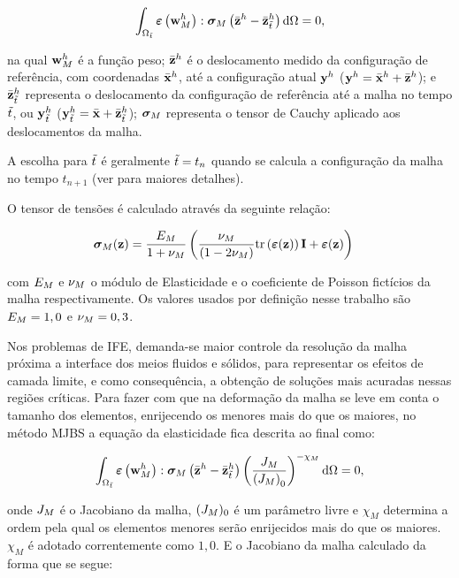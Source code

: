 \documentclass[tese_patricia]{subfiles}
\begin{document}
\begin{align}
	\int_{\Omega_{\tilde{t}}} \bm{\varepsilon} \left(\mathbf{w}_{M}^h\right) : \boldsymbol{\sigma}_{M} \left(\bar{\mathbf{z}}^h - \bar{\mathbf{z}}_{\tilde{t}}^h \right) \mathrm{d} \Omega = 0,
	\label{eq:elasticity}
\end{align}


\noindent na qual $\mathbf{w}_{M}^h$ é a função peso; $\bar{\mathbf{z}}^h$ é o deslocamento medido da configuração de referência, com coordenadas $\bar{\mathbf{x}}^h$, até a configuração atual $\mathbf{y}^h$ ($\mathbf{y}^h = \bar{\mathbf{x}}^h +\bar{\mathbf{z}}^h $); e 
$\bar{\mathbf{z}}_{\tilde{t}}^h$ representa o deslocamento da configuração de referência até a malha no tempo ${\tilde{t}}$, ou $\mathbf{y}^h_{\tilde{t}}$ ($\mathbf{y}^h_{\tilde{t}} = \bar{\mathbf{x}} + \bar{\mathbf{z}}_{\tilde{t}}^h$); $\boldsymbol{\sigma}_{M}$ representa o tensor de Cauchy aplicado aos deslocamentos da malha.

A escolha para $\tilde{t}$ é geralmente $\tilde{t} = {t_{n}}$ quando se calcula a configuração da malha no tempo ${t_{n+1}}$ (ver  para maiores detalhes). 

O tensor de tensões é calculado através da seguinte relação:

\begin{align}
	\boldsymbol{\sigma}_{M}(\mathbf{z})
	&=
	\frac{E_{M}}{1+\nu_{M}}
	\left(
	\frac{\nu_{M}}{(1 - 2 \nu_{M})}
	\mathrm{tr}\left(\bm{\varepsilon}(\mathbf{z})\right)\mathbf{I}
	+
	\bm{\varepsilon}(\mathbf{z})
	\right)
\end{align}

\noindent com $E_{M}$ e $\nu_{M}$ o módulo de Elasticidade e o coeficiente de Poisson fictícios da malha respectivamente. Os valores usados por definição nesse trabalho são $E_{M} =1,0$ e $\nu_{M} = 0,3$.

Nos problemas de IFE, demanda-se maior controle da resolução da malha próxima a interface dos meios fluidos e sólidos, para representar os efeitos de camada limite, e como consequência, a obtenção de soluções mais acuradas nessas regiões críticas. Para fazer com que na deformação da malha se leve em conta o tamanho dos elementos, enrijecendo os menores mais do que os maiores, no método MJBS a equação da elasticidade fica descrita ao final como:

\begin{align}
	\int_{\Omega_{\tilde{t}}} \bm{\varepsilon} \left(\mathbf{w}_{M}^h\right) : \boldsymbol{\sigma}_{M} \left(\bar{\mathbf{z}}^h- \bar{\mathbf{z}}_{\tilde{t}}^h\right) \left(\frac{J_{M}}{\left({J_{M}}\right)_0}\right)^{-\chi_M} \mathrm{d} \Omega = 0, 
	\label{eq:elasticityMJBS}
\end{align}

\noindent onde $J_{M}$ é o Jacobiano da malha, $(J_{M})_0$ é um parâmetro livre e $\chi_M$ determina a ordem pela qual os elementos menores serão enrijecidos mais do que os maiores.  $\chi_M$ é adotado correntemente como $1,0$. E o Jacobiano da malha calculado da forma que se segue:
\end{document}
